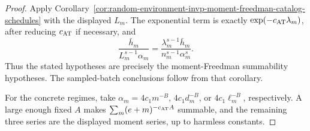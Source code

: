 \documentclass[11pt]{amsart}
\numberwithin{equation}{section}
\theoremstyle{definition}
\theoremstyle{remark}
\begin{document}
\begin{proof}
Apply
Corollary~\ref{cor:random-environment-invp-moment-freedman-catalog-schedules}
with the displayed \(L_m\).  The exponential term is exactly
\(\exp(-c_{\rm AT}\lambda_m)\), after reducing \(c_{\rm AT}\) if necessary, and
\[
  \frac{\bar h_m}{L_m^{s-1}\alpha_m}
  =
  \frac{\lambda_m^{s-1}\bar h_m}{n_m^{s-1}\alpha_m^s}.
\]
Thus the stated hypotheses are precisely the moment-Freedman summability
hypotheses.  The sampled-batch conclusions follow from that corollary.

For the concrete regimes, take \(\alpha_m=4c_1m^{-B}\),
\(4c_1d_m^{-B}\), or \(4c_1\ell_m^{-B}\), respectively.  A large enough fixed
\(A\) makes \(\sum_m(e+m)^{-c_{\rm AT}A}\) summable, and the remaining three
series are the displayed moment series, up to harmless constants.
\end{proof}
\end{document}
